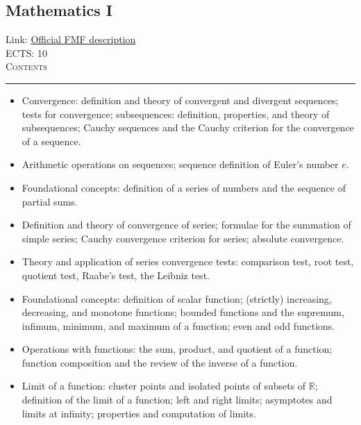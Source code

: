 \documentclass[11pt, a4paper]{article}
\newenvironment{course}[3]{
\subsection{#1}%
Link: \href{#2}{Official FMF description}\\%
ECTS: #3%
\vspace{1ex}
\\
{\large \textsc{Contents}}\\[-0.9ex]%
\rule{\textwidth}{0.5pt}
\vspace{-3ex}
}
{}
\newenvironment{chapter}[1]{
\begin{tcolorbox}[title=#1, breakable]
}
{\end{tcolorbox}}
\begin{document}
\begin{course}{Mathematics I}{https://www.fmf.uni-lj.si/en/study-physics/programmes/1fiz/2020/7000777/courses/520/}{10}
\begin{chapter}{Sequences of numbers}
\begin{itemize}
            \item Convergence: definition and theory of convergent and divergent sequences; tests for convergence;
            subsequences: definition, properties, and theory of subsequences;
            Cauchy sequences and the Cauchy criterion for the convergence of a sequence.

            \item Arithmetic operations on sequences; sequence definition of Euler's number $ e $.
        
        \end{itemize}
    \end{chapter}

    \begin{chapter}{Series of numbers}
        \begin{itemize}
        
            \item Foundational concepts: definition of a series of numbers and the sequence of partial sums.

            \item Definition and theory of convergence of series; formulae for the summation of simple series; Cauchy convergence criterion for series; absolute convergence.

            \item Theory and application of series convergence tests: comparison test, root test, quotient test, Raabe's test, the Leibniz test.
        
        \end{itemize}
    \end{chapter}

    \begin{chapter}{Functions of a single variable}
        \begin{itemize}
        
            \item Foundational concepts: definition of scalar function; (strictly) increasing, decreasing, and monotone functions; bounded functions and the supremum, infimum, minimum, and maximum of a function; even and odd functions.

            \item Operations with functions: the sum, product, and quotient of a function; function composition and the review of the inverse of a function.

            \item Limit of a function: cluster points and isolated points of subsets of $ \mathbb{R} $; definition of the limit of a function; left and right limits; asymptotes and limits at infinity; properties and computation of limits.


\end{itemize}
\end{chapter}
\end{course}
\end{document}
